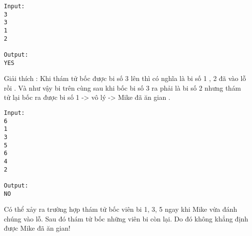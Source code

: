 \begin{verbatim}
Input:
3
3
1
2

Output:
YES
\end{verbatim}

   Giải thích : Khi thám tử bốc được bi số 3 lên thì có nghĩa là bi số 1 , 2 đã vào lỗ rồi . Và như vậy bi trên cùng sau khi bốc bi số 3 ra phải là bi số 2 nhưng thám tử lại bốc ra được bi số 1 -> vô lý -> Mike đã ăn gian .  
\begin{verbatim}
Input:
6
1
3
5
6
4
2

Output:
NO
\end{verbatim}

   Có thể xảy ra trường hợp thám tử bốc viên bi 1, 3, 5 ngay khi Mike vừa đánh chúng vào lỗ. Sau đó thám tử bốc những viên bi còn lại. Do đó không khẳng định được Mike đã ăn gian!